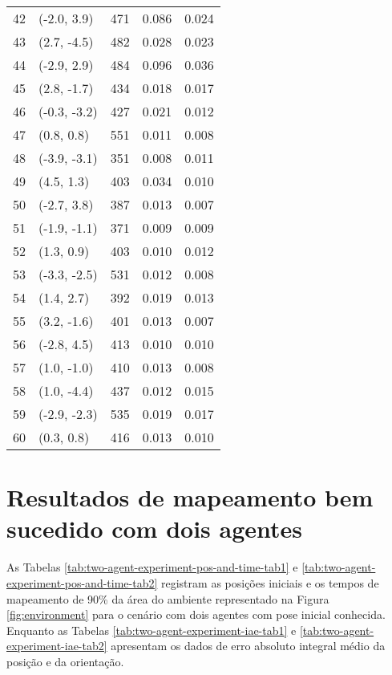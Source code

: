 \begin{table}[]
\begin{tabularx}{\textwidth}{@{}YYYYY@{}}
42 &(-2.0, 3.9)&       471& 0.086&         0.024 \\
43 &(2.7, -4.5)&       482& 0.028&         0.023 \\
44 &(-2.9, 2.9)&       484& 0.096&         0.036 \\
45 &(2.8, -1.7)&       434& 0.018&         0.017 \\
46 &(-0.3, -3.2)&       427& 0.021&         0.012 \\
47 &(0.8, 0.8)&       551& 0.011&         0.008 \\
48 &(-3.9, -3.1)&       351& 0.008&         0.011 \\
49 &(4.5, 1.3)&       403& 0.034&         0.010 \\
50 &(-2.7, 3.8)&       387& 0.013&         0.007 \\
51 &(-1.9, -1.1)&       371& 0.009&         0.009 \\
52 &(1.3, 0.9)&       403& 0.010&         0.012 \\
53 &(-3.3, -2.5)&       531& 0.012&         0.008 \\
54 &(1.4, 2.7)&       392& 0.019&         0.013 \\
55 &(3.2, -1.6)&       401& 0.013&         0.007 \\
56 &(-2.8, 4.5)&       413& 0.010&         0.010 \\
57 &(1.0, -1.0)&       410& 0.013&         0.008 \\
58 &(1.0, -4.4)&       437& 0.012&         0.015 \\
59 &(-2.9, -2.3)&       535& 0.019&         0.017 \\
60 &(0.3, 0.8)&       416& 0.013&         0.010 
\\ \hline
\end{tabularx}
  
\end{table}

\clearpage

\section{Resultados de mapeamento bem sucedido com dois agentes}
\label{app:two-agent-data}

As Tabelas \ref{tab:two-agent-experiment-pos-and-time-tab1} e \ref{tab:two-agent-experiment-pos-and-time-tab2} registram as posições 
iniciais e os tempos de mapeamento de 90\% da área do ambiente 
representado na Figura \ref{fig:environment} para o cenário com dois 
agentes com pose inicial conhecida. Enquanto as Tabelas \ref{tab:two-agent-experiment-iae-tab1} e \ref{tab:two-agent-experiment-iae-tab2} apresentam os dados de erro absoluto 
integral médio da posição e da orientação.

